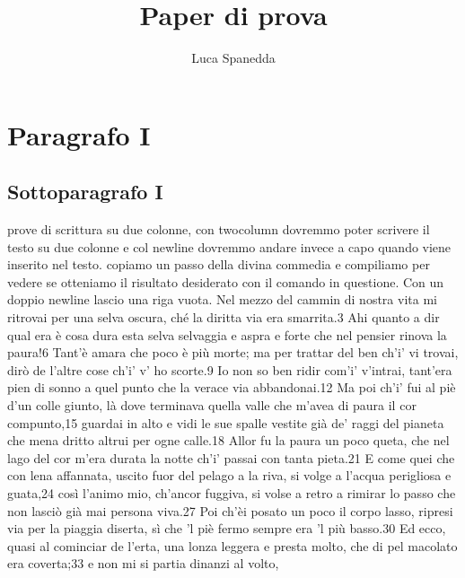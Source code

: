 \documentclass[12pt,a4paper]{article}
\begin{document}
\title{Paper di prova}
\author{Luca Spanedda}
\date{}
\maketitle

\section{Paragrafo I}
\subsection{Sottoparagrafo I}

\twocolumn
prove di scrittura su due colonne, con twocolumn dovremmo poter scrivere il testo su due colonne
\newline
e col newline dovremmo andare invece a capo quando viene  inserito nel testo.
\newline
copiamo un passo della divina commedia e compiliamo per vedere se otteniamo il risultato desiderato 
con il comando in questione. Con un doppio newline lascio una riga vuota.
\newline \newline
Nel mezzo del cammin di nostra vita
mi ritrovai per una selva oscura,
ché la diritta via era smarrita.3
Ahi quanto a dir qual era è cosa dura
esta selva selvaggia e aspra e forte
che nel pensier rinova la paura!6
Tant’è amara che poco è più morte;
ma per trattar del ben ch’i’ vi trovai,
dirò de l’altre cose ch’i’ v’ ho scorte.9
Io non so ben ridir com’i’ v’intrai,
tant’era pien di sonno a quel punto
che la verace via abbandonai.12
Ma poi ch’i’ fui al piè d’un colle giunto,
là dove terminava quella valle
che m’avea di paura il cor compunto,15
guardai in alto e vidi le sue spalle
vestite già de’ raggi del pianeta
che mena dritto altrui per ogne calle.18
Allor fu la paura un poco queta,
che nel lago del cor m’era durata
la notte ch’i’ passai con tanta pieta.21
E come quei che con lena affannata,
uscito fuor del pelago a la riva,
si volge a l’acqua perigliosa e guata,24
così l’animo mio, ch’ancor fuggiva,
si volse a retro a rimirar lo passo
che non lasciò già mai persona viva.27
Poi ch’èi posato un poco il corpo lasso,
ripresi via per la piaggia diserta,
sì che ’l piè fermo sempre era ’l più basso.30
Ed ecco, quasi al cominciar de l'erta,
una lonza leggera e presta molto,
che di pel macolato era coverta;33
e non mi si partia dinanzi al volto,
\end{document}
